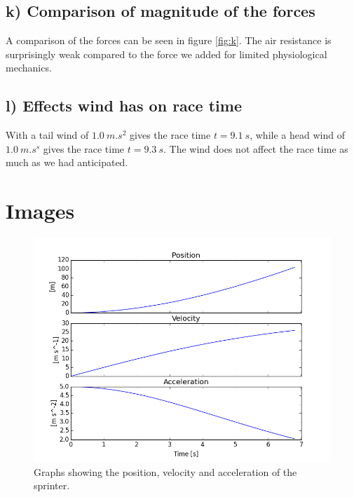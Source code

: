 \documentclass[a4paper,10pt,english]{article}
\begin{document}
\subsection*{k) Comparison of magnitude of the forces}
A comparison of the forces can be seen in figure \ref{fig:k}. The air resistance is surprisingly weak compared to the force we added for limited physiological mechanics.

\subsection*{l) Effects wind has on race time}
With a tail wind of $\SI{1.0}{m.s^{2}}$ gives the race time $t=\SI{9.1}{s}$, while a head wind of  $\SI{1.0}{m.s^{s}}$ gives the race time $t=\SI{9.3}{s}$. The wind does not affect the race time as much as we had anticipated.

\section{Images}

\begin{figure}[H]
        \centering 
        \includegraphics[scale=0.8]{e.png} 
        \caption{Graphs showing the position, velocity and acceleration of the sprinter.}
        \label{fig:e}
\end{figure}
\end{document}
